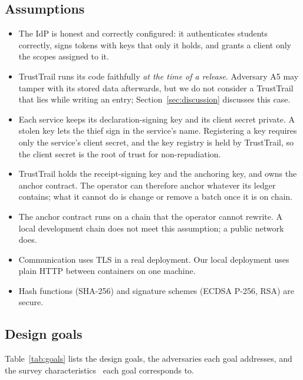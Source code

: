 \subsection{Assumptions}
\begin{itemize}
\item The IdP is honest and correctly configured: it authenticates students correctly, signs tokens with keys that only it holds, and grants a client only the scopes assigned to it.
\item TrustTrail runs its code faithfully \emph{at the time of a release}. Adversary A5 may tamper with its stored data afterwards, but we do not consider a TrustTrail that lies while writing an entry; Section~\ref{sec:discussion} discusses this case.
\item Each service keeps its declaration-signing key and its client secret private. A stolen key lets the thief sign in the service's name. Registering a key requires only the service's client secret, and the key registry is held by TrustTrail, so the client secret is the root of trust for non-repudiation.
\item TrustTrail holds the receipt-signing key and the anchoring key, and owns the anchor contract. The operator can therefore anchor whatever its ledger contains; what it cannot do is change or remove a batch once it is on chain.
\item The anchor contract runs on a chain that the operator cannot rewrite. A local development chain does not meet this assumption; a public network does.
\item Communication uses TLS in a real deployment. Our local deployment uses plain HTTP between containers on one machine.
\item Hash functions (SHA-256) and signature schemes (ECDSA P-256, RSA) are secure.
\end{itemize}

\subsection{Design goals}
Table~\ref{tab:goals} lists the design goals, the adversaries each goal addresses, and the survey characteristics~\cite{werner2017survey} each goal corresponds to.

